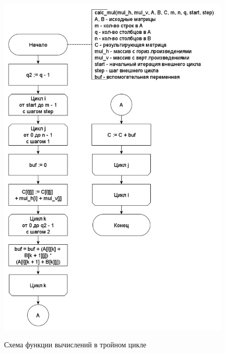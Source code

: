 \documentclass[a4paper,14pt]{article}
\begin{document}
	    	    \begin{figure}[h!]
	    	\begin{center}
	    		{\includegraphics[scale = 0.5]{triple_cycle.png}}
	    		\caption{Схема функции вычислений в тройном цикле}
	    		\label{fig:schema_m}
	    	\end{center}
	    \end{figure}
	    
\end{document}
